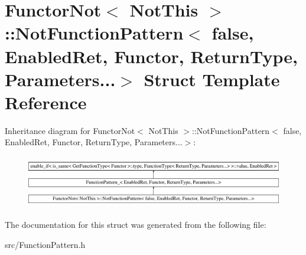 \hypertarget{struct_functor_not_1_1_not_function_pattern_3_01false_00_01_enabled_ret_00_01_functor_00_01_retufb2ef254b89dd372e341e1801901bc13}{\section{Functor\-Not$<$ Not\-This $>$\-:\-:Not\-Function\-Pattern$<$ false, Enabled\-Ret, Functor, Return\-Type, Parameters...$>$ Struct Template Reference}
\label{struct_functor_not_1_1_not_function_pattern_3_01false_00_01_enabled_ret_00_01_functor_00_01_retufb2ef254b89dd372e341e1801901bc13}
}
Inheritance diagram for Functor\-Not$<$ Not\-This $>$\-:\-:Not\-Function\-Pattern$<$ false, Enabled\-Ret, Functor, Return\-Type, Parameters...$>$\-:\begin{figure}[H]
\begin{center}
\leavevmode
\includegraphics[height=2.320442cm]{struct_functor_not_1_1_not_function_pattern_3_01false_00_01_enabled_ret_00_01_functor_00_01_retufb2ef254b89dd372e341e1801901bc13}
\end{center}
\end{figure}


The documentation for this struct was generated from the following file\-:\begin{DoxyCompactItemize}
\item 
src/Function\-Pattern.\-h\end{DoxyCompactItemize}
